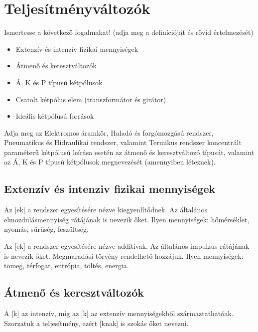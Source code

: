 \documentclass[../main.tex]{subfiles}
\begin{document}
\section{Teljesítményváltozók}

\begin{fulltheorem}
  Ismertesse a következő fogalmakat!
  (adja meg a definícióját és rövid értelmezését)
  \begin{itemize}
    \item Extenzív és intenzív fizikai mennyiségek
    \item Átmenő és keresztváltozók
    \item Á, K és P típusú kétpólusok
    \item Csatolt kétpólus elem (transzformátor és girátor)
    \item Ideális kétpólusú források
  \end{itemize}
  Adja meg az Elektromos áramkör, Haladó és forgómozgású rendszer, Pneumatikus
  és Hidraulikai rendszer, valamint Termikus rendszer koncentrált paraméterű
  kétpólusú leírása esetén az átmenő és keresztváltozó típusát, valamint az Á,
  K és P típusú kétpólusok megnevezését (amennyiben léteznek).
\end{fulltheorem}

\subsection{Extenzív és intenziv fizikai mennyiségek}

Az [ek] a rendszer egyesítésére nézve
kiegyenlítődnek. Az általános elmozdulásmennyiség rátájának is nevezik őket.
Ilyen mennyiségek: hőmérséklet, nyomás, sűrűség, feszültség.

Az [ek] a rendszer egyesítésére nézve
additívak. Az általános impulzus rátájának is nevezik őket.
Megmaradási törvény rendelhető hozzájuk.
Ilyen mennyiségek: tömeg, térfogat, entrópia, töltés, energia.

\subsection{Átmenő és keresztváltozók}

A [k] az intenzív, míg az [k]
az extenzív mennyiségekből származtathatóak. Szorzatuk a teljesítmény,
ezért [knak] is szokás őket nevezni.
\end{document}
